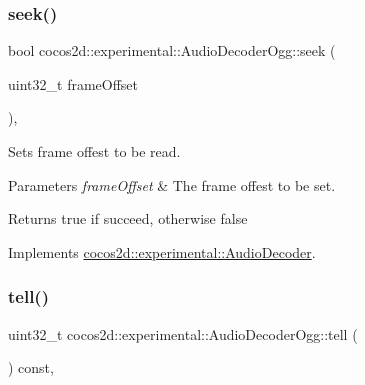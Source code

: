 \mbox{\label{classcocos2d_1_1experimental_1_1AudioDecoderOgg_ae9baafa8fb2c6f887462be0cfd1388a6}} 
\subsubsection{\texorpdfstring{seek()}{seek()}}
{\footnotesize\ttfamily bool cocos2d\+::experimental\+::\+Audio\+Decoder\+Ogg\+::seek (\begin{DoxyParamCaption}\item[{uint32\+\_\+t}]{frame\+Offset }\end{DoxyParamCaption})\hspace{0.3cm}{\ttfamily [override]}, {\ttfamily [virtual]}}



Sets frame offest to be read. 


\begin{DoxyParams}{Parameters}
{\em frame\+Offset} & The frame offest to be set. \\
\hline
\end{DoxyParams}
\begin{DoxyReturn}{Returns}
true if succeed, otherwise false 
\end{DoxyReturn}


Implements \hyperlink{classcocos2d_1_1experimental_1_1AudioDecoder_a290db97d8d4b00b6d09e145cd123b58b}{cocos2d\+::experimental\+::\+Audio\+Decoder}.

\mbox{\label{classcocos2d_1_1experimental_1_1AudioDecoderOgg_a4b0c16bf9b5f4ca1fda2752a353b836a}} 
\subsubsection{\texorpdfstring{tell()}{tell()}}
{\footnotesize\ttfamily uint32\+\_\+t cocos2d\+::experimental\+::\+Audio\+Decoder\+Ogg\+::tell (\begin{DoxyParamCaption}{ }\end{DoxyParamCaption}) const\hspace{0.3cm}{\ttfamily [override]}, {\ttfamily [virtual]}}



